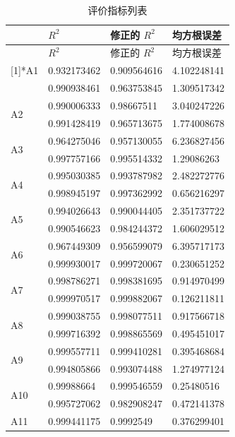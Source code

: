 \documentclass[a4paper,10.5pt]{ctexart}
\begin{document}
\begin{longtable}{p{2cm}p{4cm}p{4cm}p{4cm}}
\label{table:label} 
\caption{评价指标列表}
\hline
     & $R^2$ & 修正的 $R^2$ & 均方根误差 \\

\hline 
\endfirsthead
\hline
     & $R^2$ & 修正的 $R^2$ & 均方根误差  \\
\hline 
\endhead
\hline 
\endfoot
\multirow{2}[1]{*}{A1} & 0.932173462 & 0.909564616 & 4.102248141 \\
          & 0.990938461 & 0.963753845 & 1.309517342 \\
    \multirow{2}[0]{*}{A2} & 0.990006333 & 0.98667511 & 3.040247226 \\
          & 0.991428419 & 0.965713675 & 1.774008678 \\
    \multirow{2}[0]{*}{A3} & 0.964275046 & 0.957130055 & 6.236827456 \\
          & 0.997757166 & 0.995514332 & 1.29086263 \\
    \multirow{2}[0]{*}{A4} & 0.995030385 & 0.993787982 & 2.482272776 \\
          & 0.998945197 & 0.997362992 & 0.656216297 \\
    \multirow{2}[0]{*}{A5} & 0.994026643 & 0.990044405 & 2.351737722 \\
          & 0.990546623 & 0.984244372 & 1.606029512 \\
    \multirow{2}[0]{*}{A6} & 0.967449309 & 0.956599079 & 6.395717173 \\
          & 0.999930017 & 0.999720067 & 0.230651252 \\
    \multirow{2}[0]{*}{A7} & 0.998786271 & 0.998381695 & 0.914970499 \\
          & 0.999970517 & 0.999882067 & 0.126211811 \\
    \multirow{2}[0]{*}{A8} & 0.999038755 & 0.998077511 & 0.917566718 \\
          & 0.999716392 & 0.998865569 & 0.495451017 \\
    \multirow{2}[0]{*}{A9} & 0.999557711 & 0.999410281 & 0.395468684 \\
          & 0.994805866 & 0.993074488 & 1.274977124 \\
    \multirow{2}[0]{*}{A10} & 0.99988664 & 0.999546559 & 0.25480516 \\
          & 0.995727062 & 0.982908247 & 0.472141378 \\
    \multirow{2}[0]{*}{A11} & 0.999441175 & 0.9992549 & 0.376299401 \\

\end{longtable}
\end{document}

